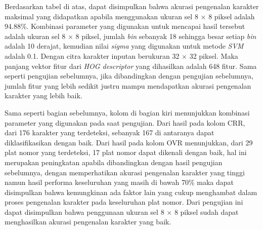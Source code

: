 Berdasarkan tabel di atas, dapat disimpulkan bahwa akurasi pengenalan karakter maksimal yang didapatkan apabila menggunakan ukuran sel 8 $\times$ 8 piksel adalah 94.88\%. Kombinasi parameter yang digunakan untuk mencapai hasil tersebut adalah ukuran sel 8 $\times$ 8 piksel, jumlah \textit{bin} sebanyak 18 sehingga besar setiap \textit{bin} adalah 10 derajat, kemudian nilai \textit{sigma} yang digunakan untuk metode \textit{SVM} adalah 0.1. Dengan citra karakter inputan berukuran 32 $\times$ 32 piksel. Maka panjang vektor fitur dari \textit{HOG descriptor} yang dihasilkan adalah 648 fitur. Sama seperti pengujian sebelumnya, jika dibandingkan dengan pengujian sebelumnya, jumlah fitur yang lebih sedikit justru mampu mendapatkan akurasi pengenalan karakter yang lebih baik.

Sama seperti bagian sebelumnya, kolom di bagian kiri menunjukkan kombinasi parameter yang digunakan pada saat pengujian. Dari hasil pada kolom CRR, dari 176 karakter yang terdeteksi, sebanyak 167 di antaranya dapat diklasifikasikan dengan baik. Dari hasil pada kolom OVR menunjukkan, dari 29 plat nomor yang terdeteksi, 17 plat nomor dapat dikenali dengan baik, hal ini merupakan peningkatan apabila dibandingkan dengan hasil pengujian sebelumnya, dengan memperhatikan akurasi pengenalan karakter yang tinggi namun hasil performa keseluruhan yang masih di bawah 70\% maka dapat disimpulkan bahwa kemungkinan ada faktor lain yang cukup menghambat dalam proses pengenalan karakter pada keseluruhan plat nomor. Dari pengujian ini dapat  disimpulkan bahwa penggunaan ukuran sel 8 $\times$ 8 piksel sudah dapat menghasilkan akurasi pengenalan karakter yang baik.\\

